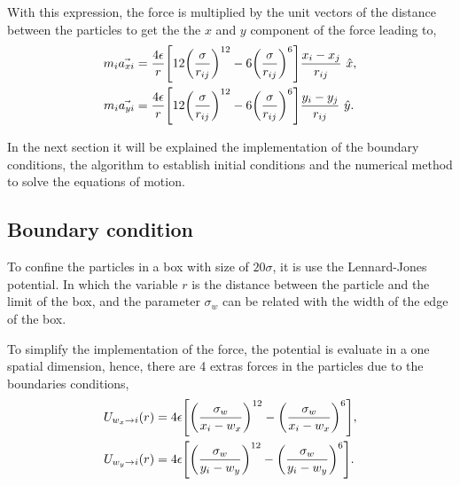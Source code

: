 \documentclass[main.tex]{subfiles}
\begin{document}
With this expression, the force is multiplied by the unit vectors of the distance between the particles to get the the $x$ and $y$ component of the force leading to,
\begin{align}
    m_{i}\vec{a_{xi}} &= \frac{4\epsilon}{r}\qty[ 12\qty(\frac{\sigma}{r_{ij}})^{12} - 6\qty(\frac{\sigma}{r_{ij}})^{6} ]\frac{x_{i}-x_{j}}{r_{ij}}~\hat{x}, \label{eqn:movementFx} \\
    m_{i}\vec{a_{yi}} &= \frac{4\epsilon}{r}\qty[ 12\qty(\frac{\sigma}{r_{ij}})^{12} - 6\qty(\frac{\sigma}{r_{ij}})^{6} ]\frac{y_{i}-y_{j}}{r_{ij}}~\hat{y}. \label{eqn:movementFy}
\end{align}

In the next section it will be explained the implementation of the boundary conditions, the algorithm to establish initial conditions and the numerical method to solve the equations of motion.



\subsection{Boundary condition}

To confine the particles in a box with size of $20\sigma$, it is use the Lennard-Jones potential.
In which the variable $r$ is the distance between the particle and the limit of the box, and the parameter $\sigma_{w}$ can be related with the width of the edge of the box.

To simplify the implementation of the force, the potential is evaluate in a one spatial dimension, hence, there are 4 extras forces in the particles due to the boundaries conditions,
\begin{align}
    U_{w_{x}\to i}\qty(r) &= 4\epsilon\qty[\qty(\frac{\sigma_{w}}{x_{i}-w_{x}})^{12} - \qty(\frac{\sigma_{w}}{x_{i}-w_{x}})^{6}], \\
    U_{w_{y}\to i}\qty(r) &= 4\epsilon\qty[\qty(\frac{\sigma_{w}}{y_{i}-w_{y}})^{12} - \qty(\frac{\sigma_{w}}{y_{i}-w_{y}})^{6}].
\end{align}

\end{document}
